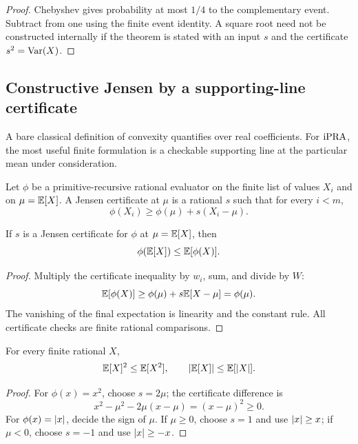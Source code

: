 \begin{proof}
Chebyshev gives probability at most \(1/4\) to the complementary event.
Subtract from one using the finite event identity.  A square root need not be
constructed internally if the theorem is stated with an input \(s\) and the
certificate \(s^2=\operatorname{Var}(X)\).
\end{proof}

\subsection{Constructive Jensen by a supporting-line certificate}

A bare classical definition of convexity quantifies over real coefficients.
For \(\mathrm{iPRA}\), the most useful finite formulation is a checkable supporting
line at the particular mean under consideration.

\begin{definition}\label{def:jensen-cert}
Let \(\phi\) be a primitive-recursive rational evaluator on the finite list of
values \(X_i\) and on \(\mu=\mathbb E[X]\).  A Jensen certificate at \(\mu\) is a
rational \(s\) such that for every \(i<m\),
\[
 \phi(X_i)\ge \phi(\mu)+s(X_i-\mu).
\]
\end{definition}

\begin{theorem}\label{thm:jensen}
If \(s\) is a Jensen certificate for \(\phi\) at \(\mu=\mathbb E[X]\), then
\[
 \phi(\mathbb E[X])\le\mathbb E[\phi(X)].
\]
\end{theorem}

\begin{proof}
Multiply the certificate inequality by \(w_i\), sum, and divide by \(W\):
\[
 \mathbb E[\phi(X)]
 \ge \phi(\mu)+s\mathbb E[X-\mu]
 =\phi(\mu).
\]
The vanishing of the final expectation is linearity and the constant rule.
All certificate checks are finite rational comparisons.
\end{proof}

\begin{corollary}\label{cor:jensen-basic}
For every finite rational \(X\),
\[
 \mathbb E[X]^2\le\mathbb E[X^2],\qquad
 \lvert \mathbb E[X]\rvert\le\mathbb E[\lvert X\rvert].
\]
\end{corollary}

\begin{proof}
For \(\phi(x)=x^2\), choose \(s=2\mu\); the certificate difference is
\[
 x^2-\mu^2-2\mu(x-\mu)=(x-\mu)^2\ge0.
\]
For \(\phi(x)=\lvert x\rvert\), decide the sign of \(\mu\).  If \(\mu\ge0\), choose
\(s=1\) and use \(\lvert x\rvert\ge x\); if \(\mu<0\), choose \(s=-1\) and use
\(\lvert x\rvert\ge-x\).
\end{proof}

